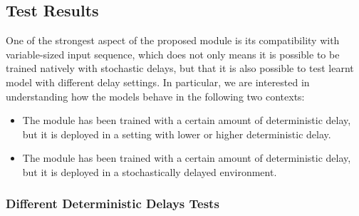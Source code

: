         \subsection{Test Results}
        \label{sub:res_test_delays}
            One of the strongest aspect of the proposed module is its compatibility with variable-sized input sequence, which does not only means it is possible to be trained natively with stochastic delays, but that it is also possible to test learnt model with different delay settings. In particular, we are interested in understanding how the models behave in the following two contexts:
            \begin{itemize}
                \setlength\itemsep{0.05em}
                \item The module has been trained with a certain amount of deterministic delay, but it is deployed in a setting with lower or higher deterministic delay. 
                \item The module has been trained with a certain amount of deterministic delay, but it is deployed in a stochastically delayed environment.
            \end{itemize}
            
            \subsubsection{Different Deterministic Delays Tests}
            
                \begin{table}[!b]
                    \centering
                    \caption{L2-TRPO trained on deterministic delays, denoted in the rows header, and Tested on deterministic delays, denoted in the columns header.}
                    \label{tab:l2trpo_det_det}
                \end{table}
                
